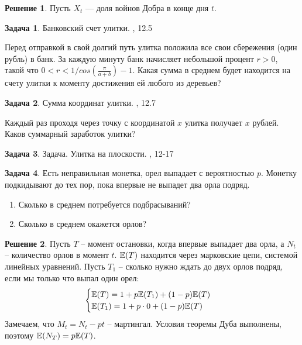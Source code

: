 \documentclass[pdftex,12pt,a4paper]{article}
\numberwithin{equation}{page} %
\theoremstyle{definition} %
\theoremstyle{definition}
\theoremstyle{definition}
\newtheorem*{solution}{Решение}
\theoremstyle{definition}
\newtheorem{problem}{Задача}
\begin{document}
\begin{solution}
Пусть $ X_{t} $ --- доля войнов Добра в конце дня $ t $.
\end{solution}


\begin{problem} Банковский счет улитки. \cite{stirzaker:prp}, 12.5

Перед отправкой в свой долгий путь улитка положила все свои сбережения (один рубль) в банк. За каждую минуту банк начисляет небольшой процент $r>0$, такой что $0<r<1/cos(\frac{\pi}{a+b})-1$. Какая сумма в среднем будет находится на счету улитки к моменту достижения ей любого из деревьев?
\end{problem}


\begin{problem} Сумма координат улитки. \cite{stirzaker:prp}, 12.7

Каждый раз проходя через точку с координатой $x$ улитка получает $x$ рублей. Каков суммарный заработок улитки?
\end{problem}


\begin{problem}
Задача. Улитка на плоскости.  \cite{stirzaker:otep}, 12-17
\end{problem}








\begin{problem}
Есть неправильная монетка, орел выпадает с вероятностью $p$. Монетку подкидывают до тех пор, пока впервые не выпадет два орла подряд. 
\begin{enumerate}
\item Сколько в среднем потребуется подбрасываний?
\item Сколько в среднем окажется орлов?
\end{enumerate}
\end{problem}

\begin{solution}
Пусть $T$ -- момент остановки, когда впервые выпадает два орла, а $N_{t}$ -- количество орлов в момент $t$. $\mathbb{E}(T)$ находится через марковские цепи, системой линейных уравнений. Пусть $T_{1}$ -- сколько нужно ждать до двух орлов подряд, если мы только что выпал один орел:
\begin{equation}
\begin{cases}
\mathbb{E}(T)=1+p\mathbb{E}(T_{1})+(1-p)\mathbb{E}(T)\\
\mathbb{E}(T_{1})=1+p\cdot 0+(1-p)\mathbb{E}(T)
\end{cases}
\end{equation}
Замечаем, что $M_{t}=N_{t}-pt$ -- мартингал. Условия теоремы Дуба выполнены, поэтому $\mathbb{E}(N_{T})=p\mathbb{E}(T)$.
\end{solution}
\end{document}
